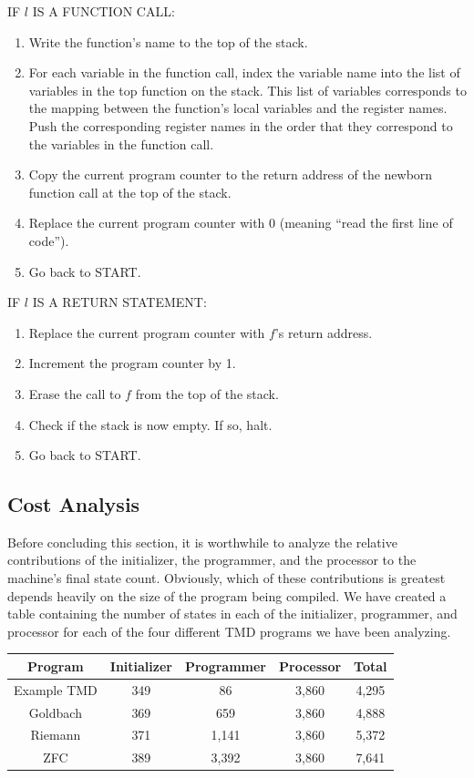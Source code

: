 \documentclass[11pt]{article}
\begin{document}
IF $l$ IS A FUNCTION CALL:
\begin{enumerate}
\item Write the function's name to the top of the stack.
\item For each variable in the function call, index the variable name into the list of variables in the top function on the stack. This list of variables corresponds to the mapping between the function's local variables and the register names. Push the corresponding register names in the order that they correspond to the variables in the function call. 
\item Copy the current program counter to the return address of the newborn function call at the top of the stack.
\item Replace the current program counter with 0 (meaning ``read the first line of code'').
\item Go back to START.
\end{enumerate}

IF $l$ IS A RETURN STATEMENT:
\begin{enumerate}
\item Replace the current program counter with $f$'s return address.
\item Increment the program counter by 1.
\item Erase the call to $f$ from the top of the stack.
\item Check if the stack is now empty. If so, halt.
\item Go back to START.
\end{enumerate}

\subsection{Cost Analysis}

Before concluding this section, it is worthwhile to analyze the relative contributions of the initializer, the programmer, and the processor to the machine's final state count. Obviously, which of these contributions is greatest depends heavily on the size of the program being compiled. We have created a table containing the number of states in each of the initializer, programmer, and processor for each of the four different TMD programs we have been analyzing. 

\begin{center}
    \begin{tabular}{||c c c c c||}
    \hline
    Program & Initializer & Programmer & Processor & Total \\ [0.5ex]
    \hline\hline
    Example TMD & 349 & 86 & 3,860 & 4,295 \\
    \hline
    Goldbach & 369 & 659 & 3,860 & 4,888 \\
    \hline
    Riemann & 371 & 1,141 & 3,860 & 5,372 \\
    \hline 
    ZFC & 389 & 3,392 & 3,860 & 7,641 \\
    \hline
    \end{tabular}
\end{center}
\end{document}
